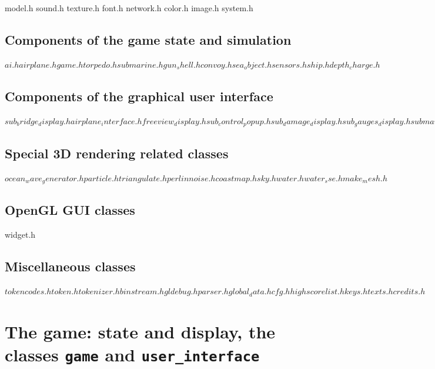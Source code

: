 \documentclass[english,a4paper,12pt]{report}
\begin{document}
model.h sound.h texture.h font.h network.h color.h image.h system.h

\subsection{Components of the game state and simulation}

$ai.h airplane.h game.h torpedo.h submarine.h gun_shell.h convoy.h
sea_object.h sensors.h ship.h depth_charge.h$

\subsection{Components of the graphical user interface}

$sub_bridge_display.h airplane_interface.h freeview_display.h
sub_control_popup.h sub_damage_display.h sub_gauges_display.h
submarine_interface.h user_display.h sub_periscope_display.h
user_interface.h sub_tdc_display.h user_popup.h sub_tdc_popup.h
logbook_display.h sub_torpedo_display.h logbook.h
sub_torpsetup_display.h ship_interface.h sub_uzo_display.h map_display.h
ships_sunk_display.h$

\subsection{Special 3D rendering related classes}

$ocean_wave_generator.h particle.h triangulate.h perlinnoise.h coastmap.h
sky.h water.h water_sse.h make_mesh.h$

\subsection{OpenGL GUI classes}

widget.h

\subsection{Miscellaneous classes}

$tokencodes.h token.h tokenizer.h binstream.h gldebug.h parser.h
global_data.h cfg.h highscorelist.h keys.h texts.h credits.h$




\section{The game: state and display, the classes \texttt{game} and
  \texttt{user\_interface}}
\end{document}
